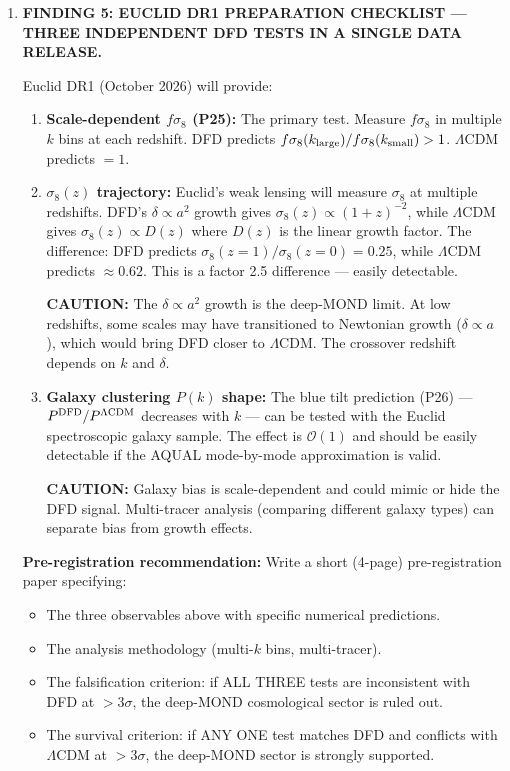 \documentclass[11pt]{article}
\newcommand{\LCDM}{$\Lambda$CDM}
\begin{document}
\begin{tcolorbox}[colback=blue!5!white, colframe=blue!70!black,
  title=\textbf{W4i22 TOP 5 FINDINGS --- PREDICTIONS TEAM}]
\begin{enumerate}
  *P6 downgraded from B to B* (wide range $0.75$--$1.05$).

\item \textbf{FINDING 5: EUCLID DR1 PREPARATION CHECKLIST ---
  THREE INDEPENDENT DFD TESTS IN A SINGLE DATA RELEASE.}

  Euclid DR1 (October 2026) will provide:

  \begin{enumerate}
  \item \textbf{Scale-dependent $f\sigma_8$ (P25):}  The primary test.
    Measure $f\sigma_8$ in multiple $k$ bins at each redshift.
    DFD predicts $f\sigma_8(k_{\rm large})/f\sigma_8(k_{\rm small}) > 1$.
    \LCDM{} predicts $= 1$.

  \item \textbf{$\sigma_8(z)$ trajectory:}  Euclid's weak lensing
    will measure $\sigma_8$ at multiple redshifts.  DFD's $\delta \propto a^2$
    growth gives $\sigma_8(z) \propto (1+z)^{-2}$, while \LCDM{} gives
    $\sigma_8(z) \propto D(z)$ where $D(z)$ is the linear growth factor.
    The difference: DFD predicts $\sigma_8(z=1)/\sigma_8(z=0) = 0.25$,
    while \LCDM{} predicts $\approx 0.62$.  This is a factor 2.5 difference
    --- easily detectable.

    \textbf{CAUTION:}  The $\delta \propto a^2$ growth is the deep-MOND
    limit.  At low redshifts, some scales may have transitioned to
    Newtonian growth ($\delta \propto a$), which would bring DFD closer
    to \LCDM.  The crossover redshift depends on $k$ and $\delta$.

  \item \textbf{Galaxy clustering $P(k)$ shape:}  The blue tilt
    prediction (P26) --- $P^{\rm DFD}/P^{\Lambda\rm CDM}$ decreases with $k$
    --- can be tested with the Euclid spectroscopic galaxy sample.
    The effect is $\mathcal{O}(1)$ and should be easily detectable if
    the AQUAL mode-by-mode approximation is valid.

    \textbf{CAUTION:}  Galaxy bias is scale-dependent and could mimic
    or hide the DFD signal.  Multi-tracer analysis (comparing different
    galaxy types) can separate bias from growth effects.
  \end{enumerate}

  \textbf{Pre-registration recommendation:}  Write a short (4-page)
  pre-registration paper specifying:
  \begin{itemize}
  \item The three observables above with specific numerical predictions.
  \item The analysis methodology (multi-$k$ bins, multi-tracer).
  \item The falsification criterion: if ALL THREE tests are inconsistent
    with DFD at $>3\sigma$, the deep-MOND cosmological sector is ruled out.
  \item The survival criterion: if ANY ONE test matches DFD and conflicts
    with \LCDM{} at $>3\sigma$, the deep-MOND sector is strongly supported.
  \end{itemize}


\end{enumerate}
\end{tcolorbox}
\end{document}
